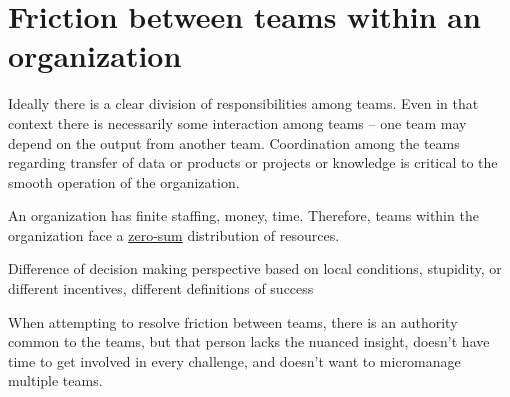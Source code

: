 \section{Friction between teams within an organization}

Ideally there is a clear division of responsibilities among teams. Even in that context there is necessarily some interaction among teams -- one team may depend on the output from another team. Coordination among the teams regarding transfer of data or products or projects or knowledge is critical to the smooth operation of the organization. 

An organization has finite staffing, money, time. Therefore, teams within the organization face a \href{https://en.wikipedia.org/wiki/Zero-sum_game}{zero-sum} distribution of resources.

Difference of decision making perspective based on local conditions, stupidity, or different incentives, different definitions of success

When attempting to resolve friction between teams, there is an authority common to the teams, but that person lacks the nuanced insight, doesn't have time to get involved in every challenge, and doesn't want to micromanage multiple teams.